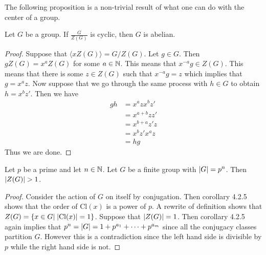 \documentclass[a4paper]{article}
\begin{document}
The following proposition is a non-trivial result of what one can do with the center of a group. 

\begin{prp}{}{} Let $G$ be a group. If $\frac{G}{Z(G)}$ is cyclic, then $G$ is abelian. \tcbline
\begin{proof}
Suppose that $\langle xZ(G)\rangle=G/Z(G)$. Let $g\in G$. Then $gZ(G)=x^aZ(G)$ for some $a\in\mathbb{N}$. This means that $x^{-a}g\in Z(G)$. This means that there is some $z\in Z(G)$ such that $x^{-a}g=z$ which implies that $g=x^az$. Now suppose that we go through the same process with $h\in G$ to obtain $h=x^bz'$. Then we have 
\begin{align*}
gh&=x^azx^bz'\\
&=x^{a+b}zz'\tag{$z\in Z(G)$}\\
&=x^{b+a}z'z\\
&=x^bz'x^az\\
&=hg
\end{align*}
Thus we are done. 
\end{proof}
\end{prp}

\begin{prp}{}{} Let $p$ be a prime and let $n\in\mathbb{N}$. Let $G$ be a finite group with $\abs{G}=p^n$. Then $\abs{Z(G)}>1$. \tcbline
\begin{proof}
Consider the action of $G$ on itself by conjugation. Then corollary 4.2.5 shows that the order of $\text{Cl}(x)$ is a power of $p$. A rewrite of definition shows that $Z(G)=\{x\in G|\;\abs{\text{Cl}(x)}=1\}$. Suppose that $\abs{Z(G)}=1$. Then corollary 4.2.5 again implies that $p^n=\abs{G}=1+p^{a_1}+\dots+p^{a_m}$ since all the conjugacy classes partition $G$. However this is a contradiction since the left hand side is divisible by $p$ while the right hand side is not. 
\end{proof}
\end{prp}
\end{document}
